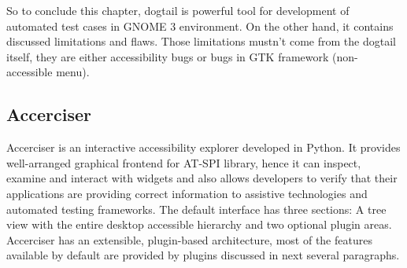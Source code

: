  So to conclude this chapter, dogtail is powerful tool for development of automated test cases in GNOME 3 environment. On the other hand, it contains discussed limitations and flaws. Those limitations mustn't come from the dogtail itself, they are either accessibility bugs or bugs in GTK framework (non-accessible menu).  

\subsection{Accerciser}
Accerciser is an interactive accessibility explorer developed in Python. It provides well-arranged graphical frontend for AT-SPI library, hence it can inspect, examine and interact with widgets and also allows developers to verify that their applications are providing correct information to assistive technologies and automated testing frameworks. The default interface has three sections: A tree view with the entire desktop accessible hierarchy and two optional plugin areas. Accerciser has an extensible, plugin-based architecture, most of the features available by default are provided by plugins discussed in next several paragraphs.

